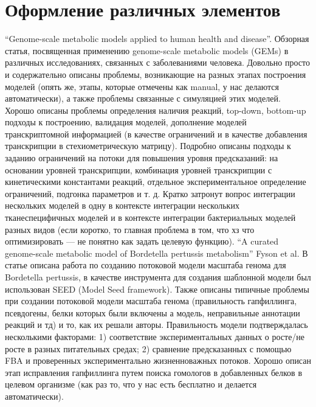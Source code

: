 \chapter{Оформление различных элементов} \label{chapt1}

“Genome-scale metabolic models applied to human health and disease”. Обзорная статья, посвященная применению genome-scale metabolic models (GEMs) в различных исследованиях, связанных с заболеваниями человека. Довольно просто и содержательно описаны проблемы, возникающие на разных этапах построения моделей (опять же, этапы, которые отмечены как manual, у нас делаются автоматически), а также проблемы связанные с симуляцией этих моделей. Хорошо описаны проблемы определения наличия реакций, top-down, bottom-up подходы к построению, валидация моделей, дополнение моделей транскриптомной информацией (в качестве ограничений и в качестве добавления транскрипции в стехиометрическую матрицу). Подробно описаны подходы к заданию ограничений на потоки для повышения уровня предсказаний: на основании уровней транскрипции, комбинация уровней транскрипции с кинетическими константами реакций, отдельное экспериментальное определение ограничений, подгонка параметров и т. д. Кратко затронут вопрос интеграции нескольких моделей в одну в контексте интеграции нескольких тканеспецифичных моделей и в контексте интеграции бактериальных моделей разных видов (если коротко, то главная проблема в том, что хз что оптимизировать — не понятно как задать целевую функцию). 
“A curated genome-scale metabolic model of Bordetella pertussis metabolism” Fyson et al. В статье описана работа по созданию потоковой модели масштаба генома для Bordetella pertussis, в качестве инструмента для создания шаблонной модели был использован SEED (Model Seed framework). Также описаны типичные проблемы при создании потоковой модели масштаба генома (правильность гапфиллинга, псевдогены, белки которых были включены а модель, неправильные аннотации реакций и тд) и то, как их решали авторы. Правильность модели подтверждалась несколькими факторами: 1) соответствие экспериментальных данных о росте/не росте в разных питательных средах; 2) сравнение предсказанных с помощью FBA и проверенных экспериментально жизненноважных потоков. Хорошо описан этап исправления гапфиллинга путем поиска гомологов в добавленных белков в целевом организме (как раз то, что у нас есть бесплатно и делается автоматически).

